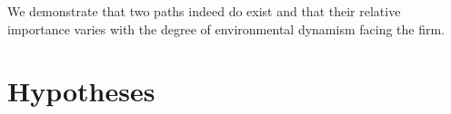 \documentclass[review,fleqn]{elsarticle}\usepackage[]{graphicx}\usepackage[]{color}
\begin{document}








We demonstrate that two paths indeed do exist and that their relative importance varies
with the degree of environmental dynamism facing the firm.

\section{Hypotheses}\label{sec:hyp}

\end{document}
